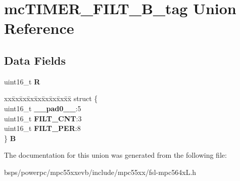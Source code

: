\hypertarget{unionmcTIMER__FILT__16B__tag}{}\section{mc\+T\+I\+M\+E\+R\+\_\+\+F\+I\+L\+T\+\_\+B\+\_\+tag Union Reference}
\label{unionmcTIMER__FILT__16B__tag}
\subsection*{Data Fields}
\begin{DoxyCompactItemize}
\item 
\mbox{\label{unionmcTIMER__FILT__16B__tag_a32f62abcf8af13faea679e7784bd7edd}} 
uint16\+\_\+t {\bfseries R}
\item 
\mbox{\label{unionmcTIMER__FILT__16B__tag_a6f6cdb5a055617ad17fde25b069f38f0}} 
\begin{tabbing}
xx\=xx\=xx\=xx\=xx\=xx\=xx\=xx\=xx\=\kill
struct \{\\
\>uint16\_t {\bfseries \_\_pad0\_\_}:5\\
\>uint16\_t {\bfseries FILT\_CNT}:3\\
\>uint16\_t {\bfseries FILT\_PER}:8\\
\} {\bfseries B}\\

\end{tabbing}\end{DoxyCompactItemize}


The documentation for this union was generated from the following file\+:\begin{DoxyCompactItemize}
\item 
bsps/powerpc/mpc55xxevb/include/mpc55xx/fsl-\/mpc564x\+L.\+h\end{DoxyCompactItemize}
